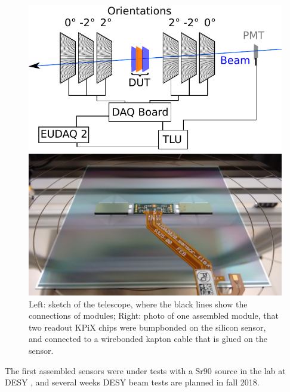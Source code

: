 \begin{figure}[!ht]%
\centering
\hspace{-100px}
\parbox{1.2in}{
\includegraphics[width=2.5\linewidth]{pics/principle.pdf}
}%
\hspace{150px}
\begin{minipage}{1.2in}%
\includegraphics[width=2.5\linewidth]{pics/sensor_module1.jpg}
\end{minipage}%
\caption{Left: sketch of the \lycoris telescope, where the black lines show the connections of modules;
Right: photo of one assembled module, that two readout KPiX chips were bumpbonded on the silicon sensor, and connected to a wirebonded kapton cable that is glued on the sensor.}%
\label{fig:1figs}%
\end{figure}

The first assembled sensors were under tests with a Sr90 source in the lab at DESY , and several weeks DESY beam tests are planned in fall 2018.

